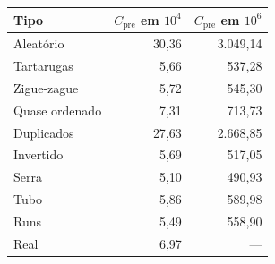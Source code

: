 \begin{tabular}{lrr}
\hline
\textbf{Tipo} & \textbf{$C_{\text{pre}}$ em $10^4$} & \textbf{$C_{\text{pre}}$ em $10^6$} \\
\hline
Aleatório & 30,36 & 3.049,14 \\
Tartarugas & 5,66 & 537,28 \\
Zigue-zague & 5,72 & 545,30 \\
Quase ordenado & 7,31 & 713,73 \\
Duplicados & 27,63 & 2.668,85 \\
Invertido & 5,69 & 517,05 \\
Serra & 5,10 & 490,93 \\
Tubo & 5,86 & 589,98 \\
Runs & 5,49 & 558,90 \\
Real & 6,97 & {---} \\
\hline
\end{tabular}

